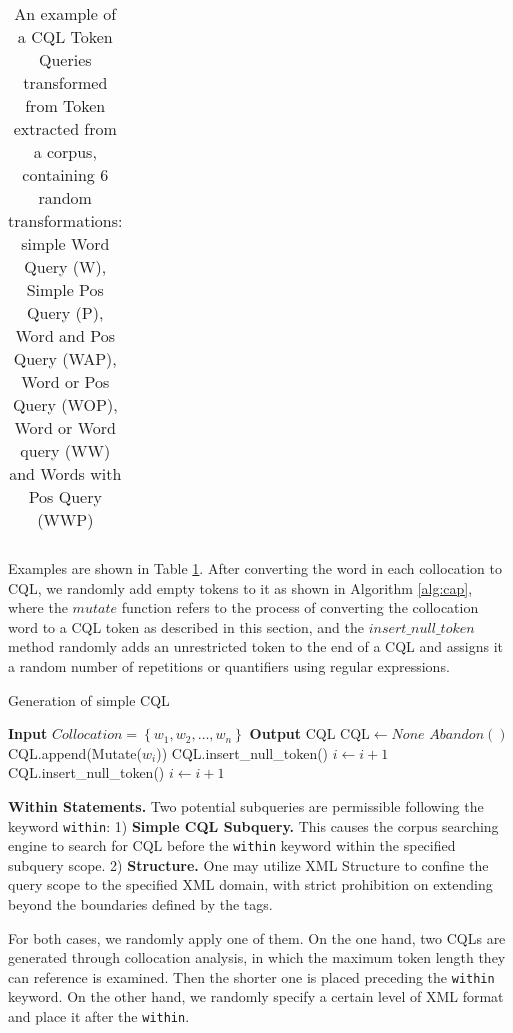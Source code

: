 \documentclass[11pt]{article}
\begin{document}
\begin{CJK*}{UTF8}{gbsn}
\begin{table}
\begin{tabular}{p{5em}p{12em}}
    \hline
    \end{tabular}
    \caption{An example of a CQL Token Queries transformed from Token extracted from a corpus, containing 6 random transformations: simple Word Query (W), Simple Pos Query (P), Word and Pos Query (WAP), Word or Pos Query (WOP), Word or Word query (WW) and Words with Pos Query (WWP)}
    \label{tab:simpleTokenExample}
\end{table}

Examples are shown in Table \ref{tab:simpleTokenExample}. After converting the word in each collocation to CQL, we randomly add empty tokens to it as shown in Algorithm \ref{alg:cap}, where the $mutate$ function refers to the process of converting the collocation word to a CQL token as described in this section, and the $insert\_null\_token$ method randomly adds an unrestricted token to the end of a CQL and assigns it a random number of repetitions or quantifiers using regular expressions.



\begin{algorithm}
\caption{Generation of simple CQL}\label{alg:cap}
\begin{algorithmic}
\State \textbf{Input} $Collocation = \left\{ w_1, w_2, \ldots, w_n \right\}$
\State \textbf{Output} CQL
\State CQL$\gets None $ 
    \State $Abandon()$
\Else
    \State CQL.append(Mutate($w_i$))
        \State CQL.insert\_null\_token()
        \State $i \gets i + 1$    
    \Else
            \State CQL.insert\_null\_token()
        \EndIf
    \EndIf
    \State $i \gets i + 1$
\EndIf
\EndWhile
\end{algorithmic}
\end{algorithm}

\textbf{Within Statements. }
Two potential subqueries are permissible following the keyword \verb|within|:
 1) \textbf{Simple CQL Subquery.} This causes the corpus searching engine to search for CQL before the \verb|within| keyword within the specified subquery scope. 
 2) \textbf{Structure.} One may utilize XML Structure to confine the query scope to the specified XML domain, with strict prohibition on extending beyond the boundaries defined by the tags. 

For both cases, we randomly apply one of them. On the one hand, two CQLs are generated through collocation analysis, in which the maximum token length they can reference is examined. Then the shorter one is placed preceding the \verb|within| keyword. On the other hand, we randomly specify a certain level of XML format and place it after the \verb|within|. 


\end{CJK*}
\end{document}
